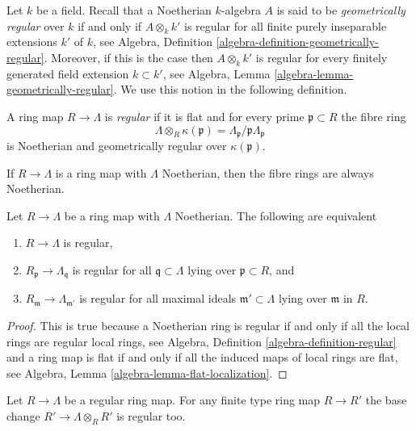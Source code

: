 \noindent
Let $k$ be a field. Recall that a Noetherian $k$-algebra $A$ is
said to be {\it geometrically regular} over $k$ if and only if
$A \otimes_k k'$ is regular for all finite purely inseparable
extensions $k'$ of $k$, see
Algebra, Definition \ref{algebra-definition-geometrically-regular}.
Moreover, if this is the case then $A \otimes_k k'$ is regular
for every finitely generated field extension $k \subset k'$, see
Algebra, Lemma \ref{algebra-lemma-geometrically-regular}.
We use this notion in the following definition.

\begin{definition}
\label{definition-regular}
A ring map $R \to \Lambda$ is {\it regular} if it is flat and
for every prime $\mathfrak p \subset R$ the fibre ring
$$
\Lambda \otimes_R \kappa(\mathfrak p) =
\Lambda_\mathfrak p/\mathfrak p\Lambda_\mathfrak p
$$
is Noetherian and geometrically regular over $\kappa(\mathfrak p)$.
\end{definition}

\noindent
If $R \to \Lambda$ is a ring map with $\Lambda$ Noetherian, then the
fibre rings are always Noetherian.

\begin{lemma}
\label{lemma-regular-local}
Let $R \to \Lambda$ be a ring map with $\Lambda$ Noetherian.
The following are equivalent
\begin{enumerate}
\item $R \to \Lambda$ is regular,
\item $R_\mathfrak p \to \Lambda_\mathfrak q$ is regular for all
$\mathfrak q \subset \Lambda$ lying over $\mathfrak p \subset R$, and
\item $R_\mathfrak m \to \Lambda_{\mathfrak m'}$ is regular for
all maximal ideals $\mathfrak m' \subset \Lambda$
lying over $\mathfrak m$ in $R$.
\end{enumerate}
\end{lemma}

\begin{proof}
This is true because a Noetherian ring is regular if and only if
all the local rings are regular local rings, see
Algebra, Definition \ref{algebra-definition-regular}
and a ring map is flat if and only if all the induced maps of local
rings are flat, see
Algebra, Lemma \ref{algebra-lemma-flat-localization}.
\end{proof}

\begin{lemma}
\label{lemma-regular-base-change}
Let $R \to \Lambda$ be a regular ring map.
For any finite type ring map $R \to R'$ the base change
$R' \to \Lambda \otimes_R R'$ is regular too.
\end{lemma}

